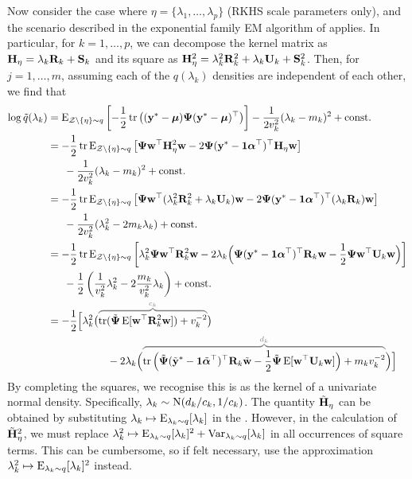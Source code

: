 Now consider the case where $\eta = \{\lambda_1,\dots,\lambda_p \}$ (RKHS scale parameters only), and the scenario described in the exponential family EM algorithm of  applies.
In particular, for $k=1,\dots,p$, we can decompose the kernel matrix as ${\mathbf H}_\eta = \lambda_k {\mathbf R}_k + {\mathbf S}_k$ and its square as ${\mathbf H}_\eta^2 = \lambda_k^2 {\mathbf R}_k^2 + \lambda_k {\mathbf U}_k + {\mathbf S}_k^2$.
Then, for $j = 1,\dots,m$, assuming each of the $q(\lambda_k)$ densities are independent of each other, we find that
\begin{align*}
  \log \tilde q(\lambda_k) 
  &= \E_{\cZ\backslash\{\eta\}\sim q} \left[ 
  - \half\tr \big((\by^* - \bmu) \bPsi (\by^* - \bmu)^\top  \big)
  \right] 
  - \frac{1}{2v_k^2} (\lambda_k - m_k)^2 + \const \\
  &= - \half\tr \E_{\cZ\backslash\{\eta\}\sim q} \left[ \bPsi\bw^\top \bH_\eta^2 \bw - 2\bPsi(\by^* - \bone\balpha^\top)^\top\bH_\eta \bw \right] \\
  &\phantom{==} - \frac{1}{2v_k^2} (\lambda_k - m_k)^2 + \const \\
  &= - \half\tr \E_{\cZ\backslash\{\eta\}\sim q} \left[ \bPsi\bw^\top (\lambda_k^2\bR_k^2 + \lambda_k\bU_k) \bw - 2\bPsi(\by^* - \bone\balpha^\top)^\top(\lambda_k\bR_k) \bw \right] \\
  &\phantom{==} - \frac{1}{2v_k^2} (\lambda_k^2 - 2m_k\lambda_k) + \const \\
  &= - \half\tr \E_{\cZ\backslash\{\eta\}\sim q} \left[ 
  \lambda_k^2\bPsi\bw^\top \bR_k^2 \bw 
  -2 \lambda_k \Big(
  \bPsi(\by^* - \bone\balpha^\top)^\top\bR_k \bw 
  -\half\bPsi\bw^\top \bU_k \bw
  \Big) \right] \\
  &\phantom{==} - \half\left(\frac{1}{v_k^2}\lambda_k^2  - 2 \frac{m_k}{v_k^2} \lambda_k \right) + \const \\
  &= -\half \Big[ 
 \lambda_k^2 \big( 
 \greyoverbrace{\tr(\tilde\bPsi\E[\bw^\top\bR_k^2\bw]) + v_k^{-2}}{c_k}
 \big) \\ 
  &\hspace{2cm} - 2\lambda_k \Big( 
  \greyoverbrace{
  \tr\Big( \tilde\bPsi(\tilde\by^* - \bone\tilde\balpha^\top)^\top\bR_k \tilde\bw 
  - \half\tilde\bPsi\E[\bw^\top \bU_k \bw] \Big) 
  + m_k v_k^{-2}}{d_k}
  \Big) \Big]
\end{align*}
By completing the squares, we recognise this is as the kernel of a univariate normal density. 
Specifically, $\lambda_k \sim \operatorname{N}(d_k/c_k,1/c_k)$.
The quantity $\tilde{{\mathbf H}}_\eta$ can be obtained by substituting $\lambda_k \mapsto \operatorname{E}_{\lambda_k\sim q}[\lambda_k]$ in the .
However, in the calculation of $\tilde{{\mathbf H}}_\eta^2$, we must replace $\lambda_k^2 \mapsto \operatorname{E}_{\lambda_k\sim q}[\lambda_k]^2 +  \operatorname{Var}_{\lambda_k\sim q}[\lambda_k]$ in all occurrences of square terms.
This can be cumbersome, so if felt necessary, use the approximation $\lambda_k^2 \mapsto \operatorname{E}_{\lambda_k\sim q}[\lambda_k]^2$ instead.

